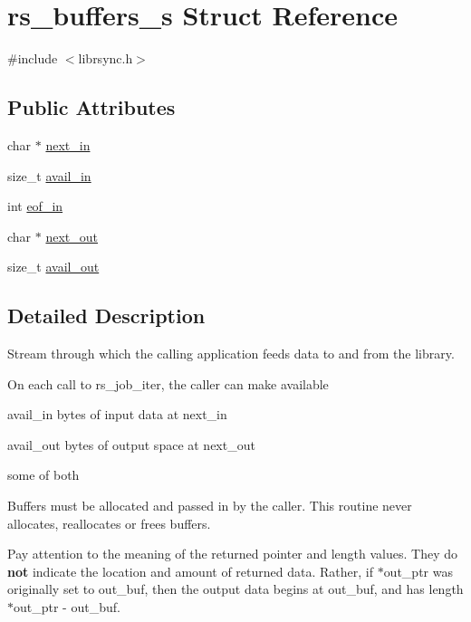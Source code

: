 \hypertarget{structrs__buffers__s}{}\section{rs\+\_\+buffers\+\_\+s Struct Reference}
\label{structrs__buffers__s}


{\ttfamily \#include $<$librsync.\+h$>$}

\subsection*{Public Attributes}
\begin{DoxyCompactItemize}
\item 
char $\ast$ \hyperlink{structrs__buffers__s_a6d5d12a1ced9a3a8891259e09c80ec20}{next\+\_\+in}
\item 
size\+\_\+t \hyperlink{structrs__buffers__s_a7bd5f1ea3c26587bf1106c1594712735}{avail\+\_\+in}
\item 
int \hyperlink{structrs__buffers__s_aa6783da2d894c77178155759cd12d16f}{eof\+\_\+in}
\item 
char $\ast$ \hyperlink{structrs__buffers__s_af3a6532c3e300a07783d61680cbdc11f}{next\+\_\+out}
\item 
size\+\_\+t \hyperlink{structrs__buffers__s_ae60f3db2f518d74aee13a02b7c9619a2}{avail\+\_\+out}
\end{DoxyCompactItemize}


\subsection{Detailed Description}
Stream through which the calling application feeds data to and from the library.

On each call to rs\+\_\+job\+\_\+iter, the caller can make available


\begin{DoxyItemize}
\item avail\+\_\+in bytes of input data at next\+\_\+in
\item avail\+\_\+out bytes of output space at next\+\_\+out
\item some of both
\end{DoxyItemize}

Buffers must be allocated and passed in by the caller. This routine never allocates, reallocates or frees buffers.

Pay attention to the meaning of the returned pointer and length values. They do {\bfseries not} indicate the location and amount of returned data. Rather, if {\ttfamily $\ast$out\+\_\+ptr} was originally set to {\ttfamily out\+\_\+buf}, then the output data begins at {\ttfamily out\+\_\+buf}, and has length {\ttfamily $\ast$out\+\_\+ptr} -\/ {\ttfamily out\+\_\+buf}.

